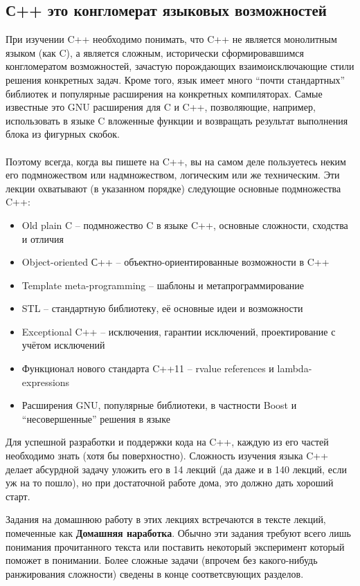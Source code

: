 \documentclass[a4paper,12pt,oneside]{article}
\begin{document}
\subsection{С++ это конгломерат языковых возможностей}\label{CppNature}

При изучении C++ необходимо понимать, что C++ не является монолитным языком (как C), а является сложным, исторически сформировавшимся конгломератом возможностей, зачастую порождающих взаимоисключающие стили решения конкретных задач. Кроме того, язык имеет много ``почти стандартных'' библиотек и популярные расширения на конкретных компиляторах. Самые известные это GNU расширения для C и C++, позволяющие, например, использовать в языке C вложенные функции и возвращать результат выполнения блока из фигурных скобок.
\paragraph{}
Поэтому всегда, когда вы пишете на C++, вы на самом деле пользуетесь неким его подмножеством или надмножеством, логическим или же техническим. Эти лекции охватывают (в указанном порядке) следующие основные подмножества C++:
\begin{itemize}
\item
Old plain C – подмножество C в языке C++, основные сложности, сходства и отличия
\item
Object-oriented С++ – объектно-ориентированные возможности в C++
\item
Template meta-programming – шаблоны и метапрограммирование
\item
STL – стандартную библиотеку, её основные идеи и возможности
\item
Exceptional C++ – исключения, гарантии исключений, проектирование с учётом исключений
\item
Функционал нового стандарта C++11 – rvalue references и  lambda-expressions
\item
Расширения GNU, популярные библиотеки, в частности Boost и ``несовершенные'' решения в языке
\end{itemize}

Для успешной разработки и поддержки кода на C++, каждую из его частей необходимо знать (хотя бы поверхностно). Сложность изучения языка C++ делает абсурдной задачу уложить его в 14 лекций (да даже и в 140 лекций, если уж на то пошло), но при достаточной работе дома, это должно дать хороший старт.

Задания на домашнюю работу в этих лекциях встречаются в тексте лекций, помеченные как \textbf{Домашняя наработка}. Обычно эти задания требуют всего лишь понимания прочитанного текста или поставить некоторый эксперимент который поможет в понимании. Более сложные задачи (впрочем без какого-нибудь ранжирования сложности) сведены в конце соответсвующих разделов.
\end{document}
